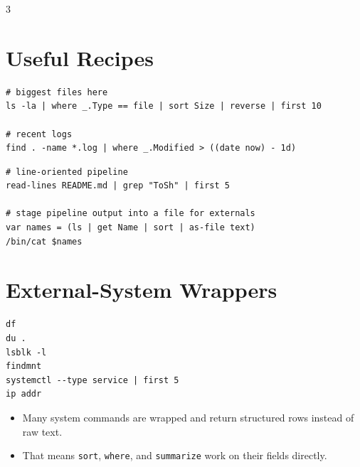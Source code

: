 \begin{multicols*}{3}
\section{Useful Recipes}
\begin{lstlisting}
# biggest files here
ls -la | where _.Type == file | sort Size | reverse | first 10

# recent logs
find . -name *.log | where _.Modified > ((date now) - 1d)
\end{lstlisting}

\begin{lstlisting}
# line-oriented pipeline
read-lines README.md | grep "ToSh" | first 5

# stage pipeline output into a file for externals
var names = (ls | get Name | sort | as-file text)
/bin/cat $names
\end{lstlisting}

\section{External-System Wrappers}
\begin{lstlisting}
df
du .
lsblk -l
findmnt
systemctl --type service | first 5
ip addr
\end{lstlisting}

\begin{itemize}
\item Many system commands are wrapped and return structured rows instead of raw text.
\item That means \texttt{sort}, \texttt{where}, and \texttt{summarize} work on their fields directly.
\end{itemize}


\end{multicols*}
\newpage


